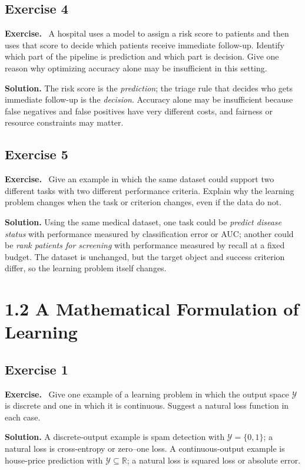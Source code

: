 \documentclass[11pt]{article}
\newenvironment{exercisebox}{\begin{framed}\noindent\textbf{Exercise.}\ }{\end{framed}}
\begin{document}
\subsection*{Exercise 4}
\begin{exercisebox}
A hospital uses a model to assign a risk score to patients and then uses that score to decide which patients receive immediate follow-up. Identify which part of the pipeline is prediction and which part is decision. Give one reason why optimizing accuracy alone may be insufficient in this setting.
\end{exercisebox}
\textbf{Solution.} The risk score is the \emph{prediction}; the triage rule that decides who gets immediate follow-up is the \emph{decision}. Accuracy alone may be insufficient because false negatives and false positives have very different costs, and fairness or resource constraints may matter.

\subsection*{Exercise 5}
\begin{exercisebox}
Give an example in which the same dataset could support two different tasks with two different performance criteria. Explain why the learning problem changes when the task or criterion changes, even if the data do not.
\end{exercisebox}
\textbf{Solution.} Using the same medical dataset, one task could be \emph{predict disease status} with performance measured by classification error or AUC; another could be \emph{rank patients for screening} with performance measured by recall at a fixed budget. The dataset is unchanged, but the target object and success criterion differ, so the learning problem itself changes.

\section{1.2 A Mathematical Formulation of Learning}
\subsection*{Exercise 1}
\begin{exercisebox}
Give one example of a learning problem in which the output space $\mathcal Y$ is discrete and one in which it is continuous. Suggest a natural loss function in each case.
\end{exercisebox}
\textbf{Solution.} A discrete-output example is spam detection with $\mathcal Y=\{0,1\}$; a natural loss is cross-entropy or zero--one loss. A continuous-output example is house-price prediction with $\mathcal Y\subseteq\mathbb R$; a natural loss is squared loss or absolute error.
\end{document}
